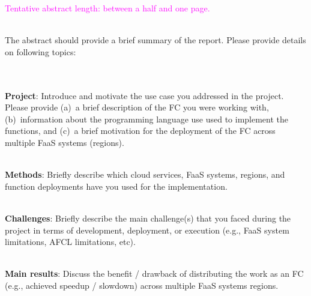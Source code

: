 \noindent

\textcolor{magenta}{Tentative abstract length: between a half and one page.}

\vspace{20 pt}

\\The abstract should provide a brief summary of the report. Please provide details on following topics:

\\\\\textbf{Project}: 
Introduce and motivate the use case you addressed in the project.
Please provide (a)~a brief description of the FC you were working with, (b)~information about the programming language use used to implement the functions, and (c)~a brief motivation for the deployment of the FC across multiple FaaS systems (regions).

\vspace{20 pt}

\\\textbf{Methods}: Briefly describe which cloud services, FaaS systems, regions, and function deployments have you used for the implementation.

\vspace{20 pt}

\\\textbf{Challenges}: Briefly describe the main challenge(s) that you faced during the project in terms of development, deployment, or execution (e.g., FaaS system limitations, AFCL limitations, etc).


\vspace{10 pt}

\\\textbf{Main results}: Discuss the benefit / drawback of distributing the work as an FC (e.g., achieved speedup / slowdown) across multiple FaaS systems regions.

